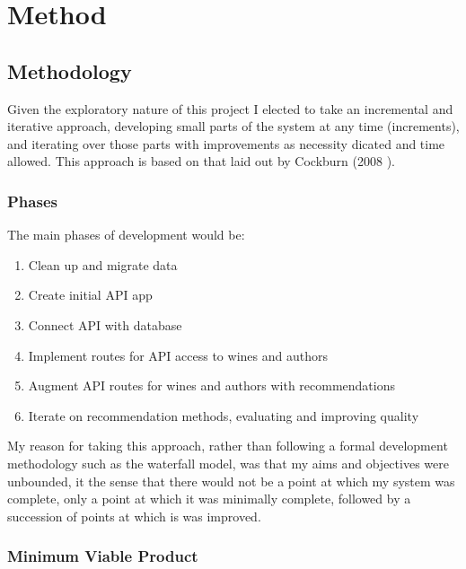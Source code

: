 \section{Method}\label{method}

\iffalse
the overall approach and rationale.
Why the project was tackled in the chosen way, and why other ways were ruled out.
\fi

\subsection{Methodology}

Given the exploratory nature of this project I elected to take an incremental and iterative approach, developing small parts of the system at any time (increments), and iterating over those parts with improvements as necessity dicated and time allowed. This approach is based on that laid out by Cockburn (2008 \cite{Cockburn08}).

\subsubsection{Phases}

The main phases of development would be:

\begin{enumerate}
    \item Clean up and migrate data
    \item Create initial API app
    \item Connect API with database
    \item Implement routes for API access to wines and authors
    \item Augment API routes for wines and authors with recommendations
    \item Iterate on recommendation methods, evaluating and improving quality
\end{enumerate}

My reason for taking this approach, rather than following a formal development methodology such as the waterfall model, was that my aims and objectives were unbounded, it the sense that there would not be a point at which my system was complete, only a point at which it was minimally complete, followed by a succession of points at which is was improved.

\subsubsection{Minimum Viable Product}

